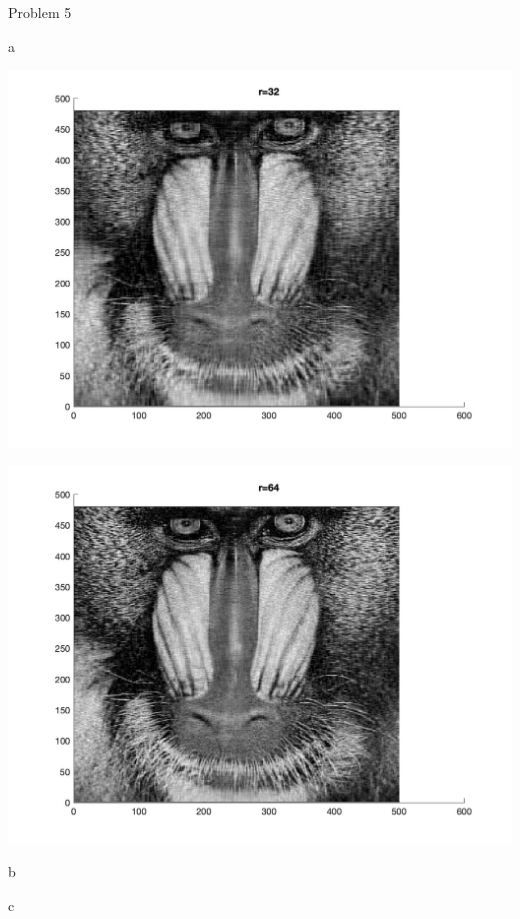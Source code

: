 \begin{section}{Problem 5}
\begin{solution}{a}
        \begin{mdframed}
            \includegraphics[scale=0.33]{DevamSisodraker_5a_32.jpg}
        \end{mdframed}

        \continued

        \begin{mdframed}
            \includegraphics[scale=0.33]{DevamSisodraker_5a_64.jpg}
        \end{mdframed}
    \end{solution}

    \newpage
    
    \begin{solution}{b}
    \end{solution}

    \begin{solution}{c}
    \end{solution}
\end{section}